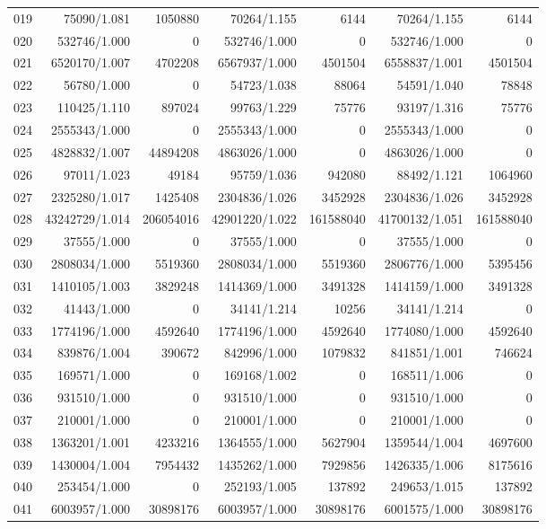 \begin{longtable}{crrrrrr}
019 & 75090/1.081 & 1050880 & 70264/1.155 & 6144 & 70264/1.155 & 6144 \\
020 & 532746/1.000 & 0 & 532746/1.000 & 0 & 532746/1.000 & 0 \\
021 & 6520170/1.007 & 4702208 & 6567937/1.000 & 4501504 & 6558837/1.001 & 4501504 \\
022 & 56780/1.000 & 0 & 54723/1.038 & 88064 & 54591/1.040 & 78848 \\
023 & 110425/1.110 & 897024 & 99763/1.229 & 75776 & 93197/1.316 & 75776 \\
024 & 2555343/1.000 & 0 & 2555343/1.000 & 0 & 2555343/1.000 & 0 \\
025 & 4828832/1.007 & 44894208 & 4863026/1.000 & 0 & 4863026/1.000 & 0 \\
026 & 97011/1.023 & 49184 & 95759/1.036 & 942080 & 88492/1.121 & 1064960 \\
027 & 2325280/1.017 & 1425408 & 2304836/1.026 & 3452928 & 2304836/1.026 & 3452928 \\
028 & 43242729/1.014 & 206054016 & 42901220/1.022 & 161588040 & 41700132/1.051 & 161588040 \\
029 & 37555/1.000 & 0 & 37555/1.000 & 0 & 37555/1.000 & 0 \\
030 & 2808034/1.000 & 5519360 & 2808034/1.000 & 5519360 & 2806776/1.000 & 5395456 \\
031 & 1410105/1.003 & 3829248 & 1414369/1.000 & 3491328 & 1414159/1.000 & 3491328 \\
032 & 41443/1.000 & 0 & 34141/1.214 & 10256 & 34141/1.214 & 0 \\
033 & 1774196/1.000 & 4592640 & 1774196/1.000 & 4592640 & 1774080/1.000 & 4592640 \\
034 & 839876/1.004 & 390672 & 842996/1.000 & 1079832 & 841851/1.001 & 746624 \\
035 & 169571/1.000 & 0 & 169168/1.002 & 0 & 168511/1.006 & 0 \\
036 & 931510/1.000 & 0 & 931510/1.000 & 0 & 931510/1.000 & 0 \\
037 & 210001/1.000 & 0 & 210001/1.000 & 0 & 210001/1.000 & 0 \\
038 & 1363201/1.001 & 4233216 & 1364555/1.000 & 5627904 & 1359544/1.004 & 4697600 \\
039 & 1430004/1.004 & 7954432 & 1435262/1.000 & 7929856 & 1426335/1.006 & 8175616 \\
040 & 253454/1.000 & 0 & 252193/1.005 & 137892 & 249653/1.015 & 137892 \\
041 & 6003957/1.000 & 30898176 & 6003957/1.000 & 30898176 & 6001575/1.000 & 30898176 \\

\end{longtable}

